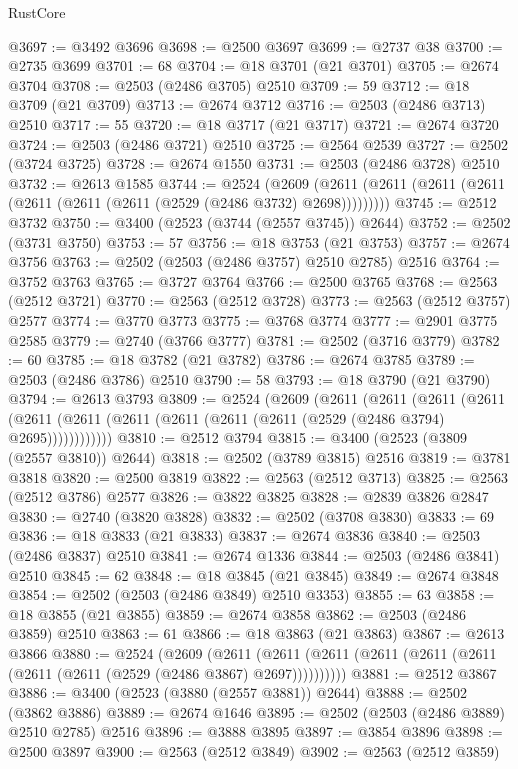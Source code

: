 \begin{lexlean}{RustCore}
\begin{coremodule}
@3697 := @3492 @3696
@3698 := @2500 @3697
@3699 := @2737 @38
@3700 := @2735 @3699
@3701 := 68
@3704 := @18 @3701 (@21 @3701)
@3705 := @2674 @3704
@3708 := @2503 (@2486 @3705) @2510
@3709 := 59
@3712 := @18 @3709 (@21 @3709)
@3713 := @2674 @3712
@3716 := @2503 (@2486 @3713) @2510
@3717 := 55
@3720 := @18 @3717 (@21 @3717)
@3721 := @2674 @3720
@3724 := @2503 (@2486 @3721) @2510
@3725 := @2564 @2539
@3727 := @2502 (@3724 @3725)
@3728 := @2674 @1550
@3731 := @2503 (@2486 @3728) @2510
@3732 := @2613 @1585
@3744 := @2524
    (@2609 (@2611 (@2611 (@2611 (@2611 (@2611 (@2611 (@2611 (@2529 (@2486 @3732) @2698)))))))))
@3745 := @2512 @3732
@3750 := @3400 (@2523 (@3744 (@2557 @3745)) @2644)
@3752 := @2502 (@3731 @3750)
@3753 := 57
@3756 := @18 @3753 (@21 @3753)
@3757 := @2674 @3756
@3763 := @2502 (@2503 (@2486 @3757) @2510 @2785) @2516
@3764 := @3752 @3763
@3765 := @3727 @3764
@3766 := @2500 @3765
@3768 := @2563 (@2512 @3721)
@3770 := @2563 (@2512 @3728)
@3773 := @2563 (@2512 @3757) @2577
@3774 := @3770 @3773
@3775 := @3768 @3774
@3777 := @2901 @3775 @2585
@3779 := @2740 (@3766 @3777)
@3781 := @2502 (@3716 @3779)
@3782 := 60
@3785 := @18 @3782 (@21 @3782)
@3786 := @2674 @3785
@3789 := @2503 (@2486 @3786) @2510
@3790 := 58
@3793 := @18 @3790 (@21 @3790)
@3794 := @2613 @3793
@3809 := @2524
    (@2609
      (@2611
        (@2611
          (@2611
            (@2611 (@2611 (@2611 (@2611 (@2611 (@2611 (@2611 (@2529 (@2486 @3794) @2695))))))))))))
@3810 := @2512 @3794
@3815 := @3400 (@2523 (@3809 (@2557 @3810)) @2644)
@3818 := @2502 (@3789 @3815) @2516
@3819 := @3781 @3818
@3820 := @2500 @3819
@3822 := @2563 (@2512 @3713)
@3825 := @2563 (@2512 @3786) @2577
@3826 := @3822 @3825
@3828 := @2839 @3826 @2847
@3830 := @2740 (@3820 @3828)
@3832 := @2502 (@3708 @3830)
@3833 := 69
@3836 := @18 @3833 (@21 @3833)
@3837 := @2674 @3836
@3840 := @2503 (@2486 @3837) @2510
@3841 := @2674 @1336
@3844 := @2503 (@2486 @3841) @2510
@3845 := 62
@3848 := @18 @3845 (@21 @3845)
@3849 := @2674 @3848
@3854 := @2502 (@2503 (@2486 @3849) @2510 @3353)
@3855 := 63
@3858 := @18 @3855 (@21 @3855)
@3859 := @2674 @3858
@3862 := @2503 (@2486 @3859) @2510
@3863 := 61
@3866 := @18 @3863 (@21 @3863)
@3867 := @2613 @3866
@3880 := @2524
    (@2609
      (@2611 (@2611 (@2611 (@2611 (@2611 (@2611 (@2611 (@2611 (@2529 (@2486 @3867) @2697))))))))))
@3881 := @2512 @3867
@3886 := @3400 (@2523 (@3880 (@2557 @3881)) @2644)
@3888 := @2502 (@3862 @3886)
@3889 := @2674 @1646
@3895 := @2502 (@2503 (@2486 @3889) @2510 @2785) @2516
@3896 := @3888 @3895
@3897 := @3854 @3896
@3898 := @2500 @3897
@3900 := @2563 (@2512 @3849)
@3902 := @2563 (@2512 @3859)

\end{coremodule}
\end{lexlean}
